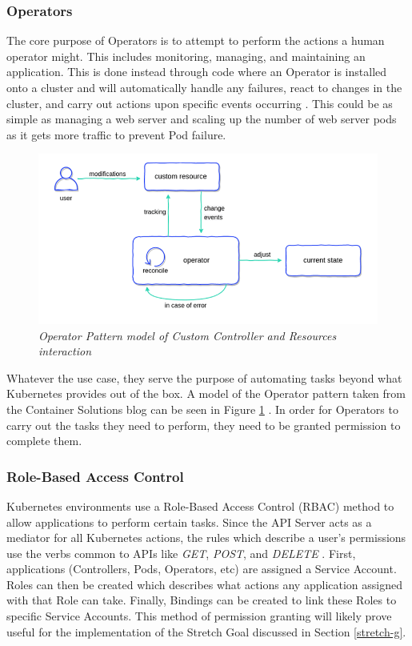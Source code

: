 \documentclass{article}
\begin{document}
\subsubsection{Operators}

The core purpose of Operators is to attempt to perform the actions a human operator might. This includes monitoring, managing, and maintaining an application. This is done instead through code where an Operator is installed onto a cluster and will automatically handle any failures, react to changes in the cluster, and carry out actions upon specific events occurring \cite{operator-pattern}. This could be as simple as managing a web server and scaling up the number of web server pods as it gets more traffic to prevent Pod failure.
\begin{figure}[H]
    \centering
    \includegraphics[width=160mm]{tech/operator-pattern.png}
    \caption{\emph{Operator Pattern model of Custom Controller and Resources interaction}}
    \label{op-pat}
\end{figure}

Whatever the use case, they serve the purpose of automating tasks beyond what Kubernetes provides out of the box. A model of the Operator pattern taken from the Container Solutions blog can be seen in Figure \ref{op-pat} \cite{op-pat-blog}. In order for Operators to carry out the tasks they need to perform, they need to be granted permission to complete them. 



\subsubsection{Role-Based Access Control}

Kubernetes environments use a Role-Based Access Control (RBAC) method to allow applications to perform certain tasks. Since the API Server acts as a mediator for all Kubernetes actions, the rules which describe a user's permissions use the verbs common to APIs like \emph{GET}, \emph{POST}, and \emph{DELETE} \cite{rbac}. First, applications (Controllers, Pods, Operators, etc) are assigned a Service Account. Roles can then be created which describes what actions any application assigned with that Role can take. Finally, Bindings can be created to link these Roles to specific Service Accounts. This method of permission granting will likely prove useful for the implementation of the Stretch Goal discussed in Section \ref{stretch-g}.
\end{document}
